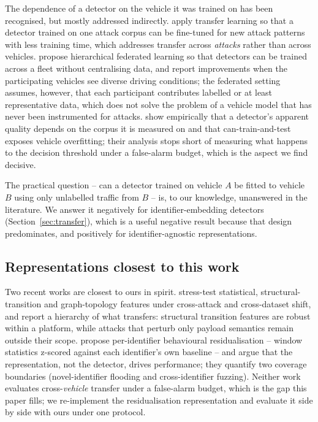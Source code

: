 \documentclass[preprint,11pt,authoryear]{elsarticle}
\begin{document}
The dependence of a detector on the vehicle it was trained on has been recognised, but mostly
addressed indirectly. \citet{khatri2023transfer} apply transfer learning so that a detector trained
on one attack corpus can be fine-tuned for new attack patterns with less training time, which
addresses transfer across \emph{attacks} rather than across vehicles.
\citet{althunayyan2024federated} propose hierarchical federated learning so that detectors can be
trained across a fleet without centralising data, and report improvements when the participating
vehicles see diverse driving conditions; the federated setting assumes, however, that each
participant contributes labelled or at least representative data, which does not solve the problem
of a vehicle model that has never been instrumented for attacks. \citet{kidmose2025cansleuth} show
empirically that a detector's apparent quality depends on the corpus it is measured on and that
can-train-and-test exposes vehicle overfitting; their analysis stops short of measuring what happens
to the decision threshold under a false-alarm budget, which is the aspect we find decisive.

The practical question -- can a detector trained on vehicle $A$ be fitted to vehicle $B$ using only
unlabelled traffic from $B$ -- is, to our knowledge, unanswered in the literature. We answer it
negatively for identifier-embedding detectors (Section~\ref{sec:transfer}), which is a useful
negative result because that design predominates, and positively for identifier-agnostic
representations.

\subsection{Representations closest to this work}

Two recent works are closest to ours in spirit. \citet{khreasat2026relational} stress-test
statistical, structural-transition and graph-topology features under cross-attack and cross-dataset
shift, and report a hierarchy of what transfers: structural transition features are robust within a
platform, while attacks that perturb only payload semantics remain outside their scope.
\citet{hegde2026residualization} propose per-identifier behavioural residualisation -- window
statistics z-scored against each identifier's own baseline -- and argue that the representation,
not the detector, drives performance; they quantify two coverage boundaries (novel-identifier
flooding and cross-identifier fuzzing). Neither work evaluates cross-\emph{vehicle} transfer under a
false-alarm budget, which is the gap this paper fills; we re-implement the residualisation
representation and evaluate it side by side with ours under one protocol.
\end{document}
